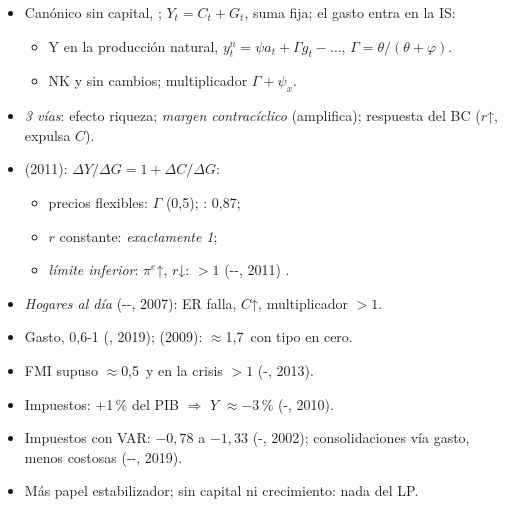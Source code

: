 \documentclass{article}
\begin{document}
\begin{columnas}
\begin{itemize}
\item Canónico  sin capital, ; $Y_t=C_t+G_t$, suma fija; el gasto entra en la IS:
  \begin{itemize}
  \item Y en la producción natural, $y^n_t=\psi a_t+\Gamma g_t-\dots$, $\Gamma=\theta/(\theta+\varphi)$.
  \item {} NK y  sin cambios; multiplicador $\Gamma+\psi_x$.
  \end{itemize}
\item \emph{3 vías}: efecto riqueza; \emph{margen contracíclico} (amplifica); respuesta del BC ($r$↑, expulsa $C$).
\end{itemize}
\begin{itemize}
\item {} (2011): $\Delta Y/\Delta G=1+\Delta C/\Delta G$:
  \begin{itemize}
  \item precios flexibles: $\Gamma$ (0,5); : 0,87;
  \item $r$ constante: \emph{exactamente 1};
  \item \emph{límite inferior}: $\pi^e$↑, $r$↓: $>1$ (--, 2011) .
  \end{itemize}
\item \emph{Hogares al día} (--, 2007): ER falla, $C$↑, multiplicador $>1$.
\end{itemize}
\begin{itemize}
\item Gasto, 0,6-1 (, 2019);  (2009): $\approx$1,7~con tipo en cero.
\item FMI supuso $\approx$0,5~y en la crisis $>1$ (-, 2013).
\item Impuestos: +1\,\% del PIB $\Rightarrow$ $Y$ $\approx-3$\,\% (-, 2010).
\item Impuestos con VAR: $-0{,}78$ a $-1{,}33$ (-, 2002); consolidaciones vía gasto, menos costosas (--, 2019).
\end{itemize}
\begin{itemize}
\item Más papel estabilizador; sin capital ni crecimiento: nada del LP.
\end{itemize}


\end{columnas}
\end{document}

